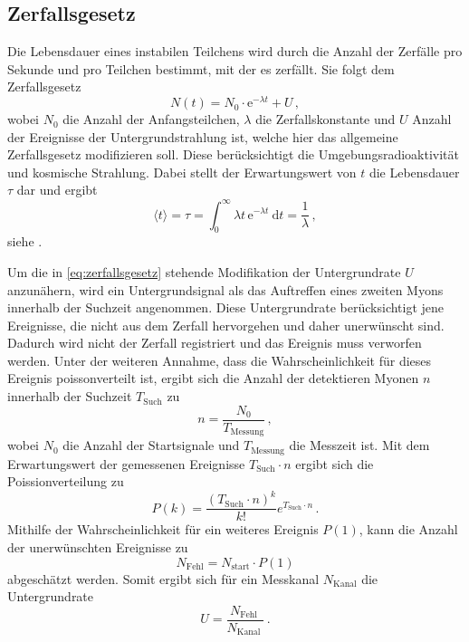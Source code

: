 \subsection{Zerfallsgesetz}
\label{subsec:Zerfallsgesetz}

Die Lebensdauer eines instabilen Teilchens wird durch die Anzahl der Zerfälle pro Sekunde 
und pro Teilchen bestimmt, mit der es zerfällt. 
Sie folgt dem Zerfallsgesetz
\begin{equation} \label{eq:zerfallsgesetz}
    N(t) = N_0 \cdot \mathrm{e}^{-\lambda t} + U \, ,
\end{equation}
wobei $N_0$ die Anzahl der Anfangsteilchen, $\lambda$ die Zerfallskonstante
und $U$ Anzahl der Ereignisse der Untergrundstrahlung ist, 
welche hier das allgemeine Zerfallsgesetz modifizieren soll.
Diese berücksichtigt die Umgebungsradioaktivität und kosmische Strahlung.
Dabei stellt der Erwartungswert von $t$ die Lebensdauer $\tau$ dar und ergibt
\begin{equation} \label{eq:tau}
    \langle t\rangle=\tau=\int_0^{\infty} \lambda t \, \mathrm{e}^{-\lambda t} \mathrm{~d} t=\frac{1}{\lambda} \, ,
\end{equation}
siehe \cite{demtroeder4}.

Um die in \autoref{eq:zerfallsgesetz} stehende Modifikation der Untergrundrate $U$ anzunähern,
wird ein Untergrundsignal als das Auftreffen eines zweiten Myons innerhalb der Suchzeit angenommen.
Diese Untergrundrate berücksichtigt jene Ereignisse, 
die nicht aus dem Zerfall hervorgehen und daher unerwünscht sind. 
Dadurch wird nicht der Zerfall registriert und das Ereignis muss verworfen werden.
Unter der weiteren Annahme, 
dass die Wahrscheinlichkeit für dieses Ereignis poissonverteilt ist, 
ergibt sich die Anzahl der detektieren Myonen $n$ innerhalb der Suchzeit $T_\text{Such}$ zu
\begin{equation*}
    n=\frac{N_{0}}{T_{\text{Messung}}} \, ,
\end{equation*}
wobei $N_0$ die Anzahl der Startsignale und $T_{\text{Messung}}$ die Messzeit ist.
Mit dem Erwartungswert der gemessenen Ereignisse $T_\text{Such} \cdot n$ ergibt sich die Poissionverteilung zu
\begin{equation*}
    P(k)=\frac{\left(T_{\mathrm{Such}} \cdot n\right)^k}{k !} e^{T_{ \mathrm{Such}} \cdot n} \, .
\end{equation*}
Mithilfe der Wahrscheinlichkeit für ein weiteres Ereignis $P(1)$, 
kann die Anzahl der unerwünschten Ereignisse zu
\begin{equation*}
    N_{\mathrm{Fehl}}=N_{\mathrm{start}} \cdot P(1)
\end{equation*}
abgeschätzt werden.
Somit ergibt sich für ein Messkanal $N_\text{Kanal}$ die Untergrundrate
\begin{equation}\label{eq:untergrundrate}
    U=\frac{N_{\text {Fehl }}}{N_{\text {Kanal }}} \, .
\end{equation}


